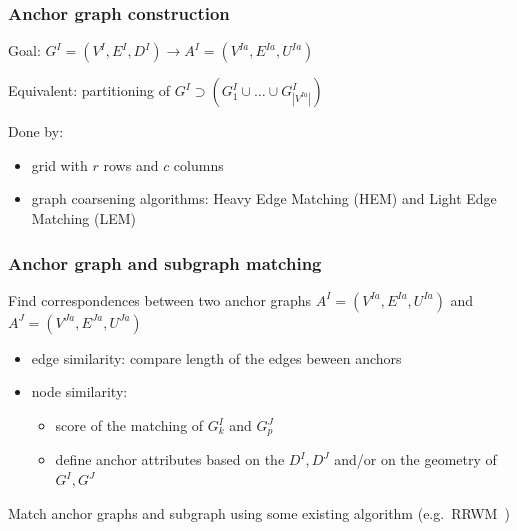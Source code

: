 \documentclass[hyperref={pdfpagelabels=false}]{beamer}
\begin{document}
\begin{frame}
\frametitle{Anchor graph construction}
Goal: $G^I=(V^I,E^I, D^I)\rightarrow A^I=(V^{Ia},E^{Ia},U^{Ia})$

Equivalent: partitioning of $G^I\supset(G^I_1\cup\dots\cup G^I_{|V^{Ia}|})$

Done by: \begin{itemize}
			\item grid with $r$ rows and $c$ columns
			\item graph coarsening algorithms: Heavy Edge Matching (HEM) and Light Edge Matching (LEM)
		\end{itemize}
\end{frame}
\begin{frame}
\frametitle{Anchor graph and subgraph matching}
Find correspondences between two anchor graphs $A^I=(V^{Ia},E^{Ia},U^{Ia})$ and $A^J=(V^{Ja},E^{Ja},U^{Ja})$

\begin{itemize}
	\item edge similarity: compare length of the edges beween anchors
	\item node similarity: 
	\begin{itemize}
		\item score of the matching of $G^I_k$ and $G^J_p$
		\item define anchor attributes based on the $D^I,D^J$ and/or on the geometry of $G^I,G^J$
	\end{itemize}
\end{itemize}

Match anchor graphs and subgraph using some existing algorithm (e.g.~RRWM~\cite{Cho2010_RRWM})
\end{frame}
\end{document}
